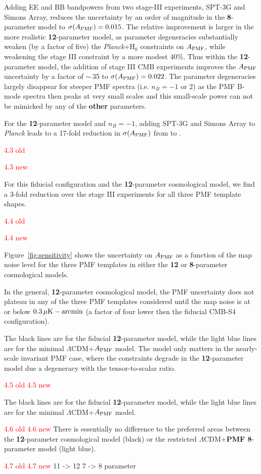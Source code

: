 \documentclass{article}
\newcommand{\apmf}{\ensuremath{A_{\rm PMF}}}
\newcommand{\lcdm}{\ensuremath{\Lambda}CDM}
\newcommand{\ho}{H\ensuremath{_0}}
\newcommand{\ukarcmin}{\ensuremath{\mu}{\rm K-arcmin}}
\newcommand{\planck}{{\sl Planck}}
\newcommand{\sptnew}{SPT-3G}
\newcommand{\simons}{Simons Array}
\newcommand{\changed}[1]{\textcolor{Red}{#1}}
\newcommand{\added}[1]{\textbf{#1}}
\begin{document}
Adding  EE and BB bandpowers from two stage-III experiments, \sptnew{} and \simons{}, reduces the uncertainty by an order of magnitude in the \added{8}-parameter model to $\sigma(\apmf)=0.015$. 
The relative improvement is larger in the more realistic \added{12}-parameter model, as parameter degeneracies substantially weaken (by a factor of five) the \planck+\ho{} constraints on \apmf{}, while weakening the stage III constraint by a  more modest 40\%. 
Thus within the \added{12}-parameter model,  the addition of stage III CMB experiments improves the \apmf{} uncertainty by a factor of $\sim$\,35 to  $\sigma(\apmf)=0.022$. 
The parameter degeneracies largely disappear for steeper PMF spectra (i.e. $n_B=-1$ or 2) as the PMF B-mode spectra then peaks at very small scales and this small-scale power can not be mimicked by any of the \added{other} parameters. 

For the \added{12}-parameter model and $n_B=-1$, adding SPT-3G and Simons Array to \planck{} leads to a 17-fold reduction in $\sigma(\apmf)$ from \fisherAlooseNbOneplk{} to \fisherAlooseNbOneSThree{}.

\changed{4.3 old}



\changed{4.3 new}

For this fiducial configuration and the \added{12}-parameter cosmological model, we find a 3-fold reduction over the stage III experiments for all three PMF template shapes. 

\changed{4.4 old}

\changed{4.4 new}

Figure~\ref{fig:sensitivity} shows the uncertainty on \apmf{} as a function of the map noise level for the three PMF templates in either the \added{12} or \added{8}-parameter cosmological models.

In the general, \added{12}-parameter cosmological model, the PMF uncertainty does not plateau in any of the three PMF templates considered until the map noise is at or below $0.3\,\ukarcmin$ (a factor of four lower then the fiducial CMB-S4 configuration). 

  The black lines are for the fiducial \added{12}-parameter model, while the light blue lines are for the minimal \lcdm{}+\apmf{} model. 
  The model only matters in the nearly-scale invariant PMF case, where the constraints degrade in the \added{12}-parameter model due a degeneracy with the tensor-to-scalar ratio. 

\changed{4.5 old}
\changed{4.5 new}

  The black lines are for the fiducial \added{12}-parameter model, while the light blue lines are for the minimal \lcdm{}+\apmf{} model. 
  
\changed{4.6 old}
\changed{4.6 new}
   There is essentially no difference to the preferred areas between the \added{12}-parameter cosmological model (black) or the restricted \lcdm{}+\added{PMF 8}-parameter model (light blue).
   
\changed{4.7 old}
\changed{4.7 new}
11 -> 12
7 -> 8 parameter

   
   
\end{document}
